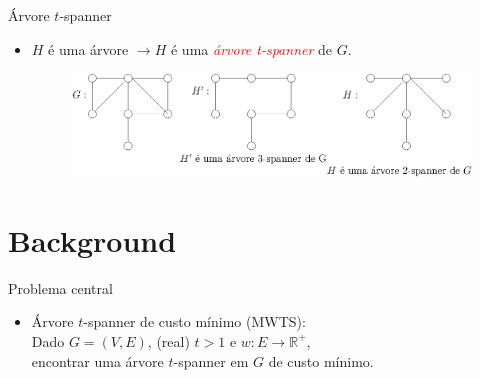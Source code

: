 \documentclass[dvipsnames]{beamer}
\newcommand{\R}{\mathbb{R}}
\begin{document}
\begin{frame}{Árvore $t$-spanner}
\begin{itemize}

 \item $H$ é uma árvore $\rightarrow H$ é uma \textcolor{red}{\emph{árvore t-spanner}} de $G$.

\begin{figure}[H]
\centering
\includegraphics[scale=0.65]{figures/arvore_spanner.eps}
\label{fig:fig1}
\end{figure}

\end{itemize}
\end{frame}


\section{Background}
\begin{frame}{Problema central}
  \begin{itemize}
    \item Árvore $t$-spanner de custo mínimo (MWTS):\\
      Dado $G=(V,E)$, (real) $t > 1$ e $w: E \rightarrow \R^{+}$, \\
    encontrar uma árvore $t$-spanner em $G$ de custo mínimo.
  \end{itemize}
\end{frame}

\end{document}
